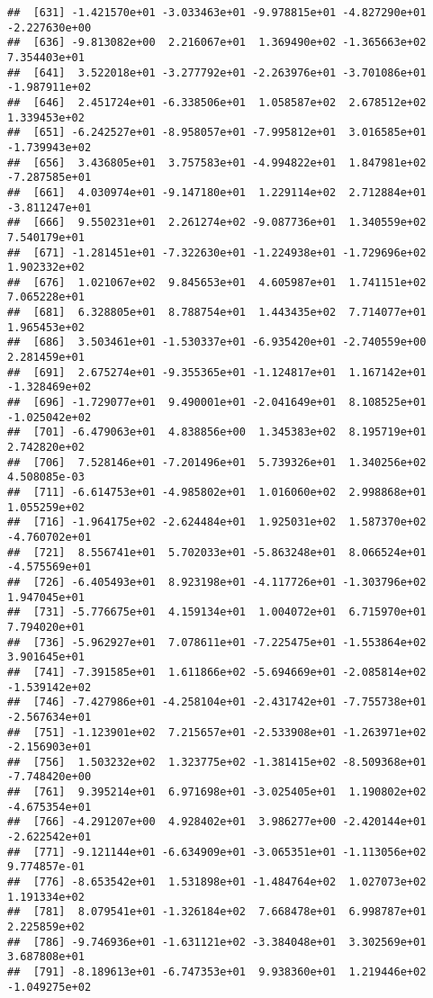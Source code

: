 \documentclass[]{book}
\begin{document}
\begin{verbatim}
##  [631] -1.421570e+01 -3.033463e+01 -9.978815e+01 -4.827290e+01 -2.227630e+00
##  [636] -9.813082e+00  2.216067e+01  1.369490e+02 -1.365663e+02  7.354403e+01
##  [641]  3.522018e+01 -3.277792e+01 -2.263976e+01 -3.701086e+01 -1.987911e+02
##  [646]  2.451724e+01 -6.338506e+01  1.058587e+02  2.678512e+02  1.339453e+02
##  [651] -6.242527e+01 -8.958057e+01 -7.995812e+01  3.016585e+01 -1.739943e+02
##  [656]  3.436805e+01  3.757583e+01 -4.994822e+01  1.847981e+02 -7.287585e+01
##  [661]  4.030974e+01 -9.147180e+01  1.229114e+02  2.712884e+01 -3.811247e+01
##  [666]  9.550231e+01  2.261274e+02 -9.087736e+01  1.340559e+02  7.540179e+01
##  [671] -1.281451e+01 -7.322630e+01 -1.224938e+01 -1.729696e+02  1.902332e+02
##  [676]  1.021067e+02  9.845653e+01  4.605987e+01  1.741151e+02  7.065228e+01
##  [681]  6.328805e+01  8.788754e+01  1.443435e+02  7.714077e+01  1.965453e+02
##  [686]  3.503461e+01 -1.530337e+01 -6.935420e+01 -2.740559e+00  2.281459e+01
##  [691]  2.675274e+01 -9.355365e+01 -1.124817e+01  1.167142e+01 -1.328469e+02
##  [696] -1.729077e+01  9.490001e+01 -2.041649e+01  8.108525e+01 -1.025042e+02
##  [701] -6.479063e+01  4.838856e+00  1.345383e+02  8.195719e+01  2.742820e+02
##  [706]  7.528146e+01 -7.201496e+01  5.739326e+01  1.340256e+02  4.508085e-03
##  [711] -6.614753e+01 -4.985802e+01  1.016060e+02  2.998868e+01  1.055259e+02
##  [716] -1.964175e+02 -2.624484e+01  1.925031e+02  1.587370e+02 -4.760702e+01
##  [721]  8.556741e+01  5.702033e+01 -5.863248e+01  8.066524e+01 -4.575569e+01
##  [726] -6.405493e+01  8.923198e+01 -4.117726e+01 -1.303796e+02  1.947045e+01
##  [731] -5.776675e+01  4.159134e+01  1.004072e+01  6.715970e+01  7.794020e+01
##  [736] -5.962927e+01  7.078611e+01 -7.225475e+01 -1.553864e+02  3.901645e+01
##  [741] -7.391585e+01  1.611866e+02 -5.694669e+01 -2.085814e+02 -1.539142e+02
##  [746] -7.427986e+01 -4.258104e+01 -2.431742e+01 -7.755738e+01 -2.567634e+01
##  [751] -1.123901e+02  7.215657e+01 -2.533908e+01 -1.263971e+02 -2.156903e+01
##  [756]  1.503232e+02  1.323775e+02 -1.381415e+02 -8.509368e+01 -7.748420e+00
##  [761]  9.395214e+01  6.971698e+01 -3.025405e+01  1.190802e+02 -4.675354e+01
##  [766] -4.291207e+00  4.928402e+01  3.986277e+00 -2.420144e+01 -2.622542e+01
##  [771] -9.121144e+01 -6.634909e+01 -3.065351e+01 -1.113056e+02  9.774857e-01
##  [776] -8.653542e+01  1.531898e+01 -1.484764e+02  1.027073e+02  1.191334e+02
##  [781]  8.079541e+01 -1.326184e+02  7.668478e+01  6.998787e+01  2.225859e+02
##  [786] -9.746936e+01 -1.631121e+02 -3.384048e+01  3.302569e+01  3.687808e+01
##  [791] -8.189613e+01 -6.747353e+01  9.938360e+01  1.219446e+02 -1.049275e+02

\end{verbatim}
\end{document}
